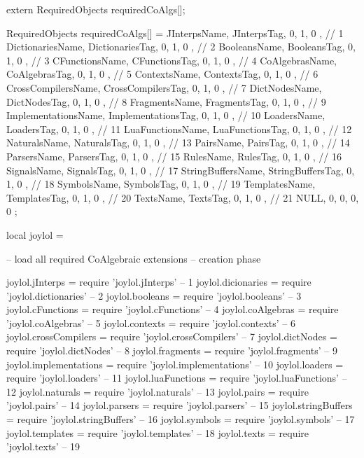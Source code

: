 extern RequiredObjects requiredCoAlgs[];
\stopCHeader
{}

\startCCode
RequiredObjects requiredCoAlgs[] = {
  { JInterpsName,        JInterpsTag,        {0, 1, 0 }}, //  1
  { DictionariesName,    DictionariesTag,    {0, 1, 0 }}, //  2
  { BooleansName,        BooleansTag,        {0, 1, 0 }}, //  3
  { CFunctionsName,      CFunctionsTag,      {0, 1, 0 }}, //  4
  { CoAlgebrasName,      CoAlgebrasTag,      {0, 1, 0 }}, //  5
  { ContextsName,        ContextsTag,        {0, 1, 0 }}, //  6
  { CrossCompilersName,  CrossCompilersTag,  {0, 1, 0 }}, //  7
  { DictNodesName,       DictNodesTag,       {0, 1, 0 }}, //  8
  { FragmentsName,       FragmentsTag,       {0, 1, 0 }}, //  9
  { ImplementationsName, ImplementationsTag, {0, 1, 0 }}, // 10
  { LoadersName,         LoadersTag,         {0, 1, 0 }}, // 11
  { LuaFunctionsName,    LuaFunctionsTag,    {0, 1, 0 }}, // 12
  { NaturalsName,        NaturalsTag,        {0, 1, 0 }}, // 13
  { PairsName,           PairsTag,           {0, 1, 0 }}, // 14
  { ParsersName,         ParsersTag,         {0, 1, 0 }}, // 15
  { RulesName,           RulesTag,           {0, 1, 0 }}, // 16
  { SignalsName,         SignalsTag,         {0, 1, 0 }}, // 17
  { StringBuffersName,   StringBuffersTag,   {0, 1, 0 }}, // 18
  { SymbolsName,         SymbolsTag,         {0, 1, 0 }}, // 19
  { TemplatesName,       TemplatesTag,       {0, 1, 0 }}, // 20
  { TextsName,           TextsTag,           {0, 1, 0 }}, // 21
  { NULL,                0,                  {0, 0, 0 }}
};
\stopCCode

\startLuaCode
local joylol = { }

-- load all required CoAlgebraic extensions -- creation phase

joylol.jInterps        = require 'joylol.jInterps'        --  1
joylol.dicionaries     = require 'joylol.dictionaries'    --  2
joylol.booleans        = require 'joylol.booleans'        --  3
joylol.cFunctions      = require 'joylol.cFunctions'      --  4
joylol.coAlgebras      = require 'joylol.coAlgebras'      --  5
joylol.contexts        = require 'joylol.contexts'        --  6
joylol.crossCompilers  = require 'joylol.crossCompilers'  --  7
joylol.dictNodes       = require 'joylol.dictNodes'       --  8
joylol.fragments       = require 'joylol.fragments'       --  9
joylol.implementations = require 'joylol.implementations' -- 10
joylol.loaders         = require 'joylol.loaders'         -- 11
joylol.luaFunctions    = require 'joylol.luaFunctions'    -- 12
joylol.naturals        = require 'joylol.naturals'        -- 13
joylol.pairs           = require 'joylol.pairs'           -- 14
joylol.parsers         = require 'joylol.parsers'         -- 15
joylol.stringBuffers   = require 'joylol.stringBuffers'   -- 16
joylol.symbols         = require 'joylol.symbols'         -- 17
joylol.templates       = require 'joylol.templates'       -- 18
joylol.texts           = require 'joylol.texts'           -- 19

